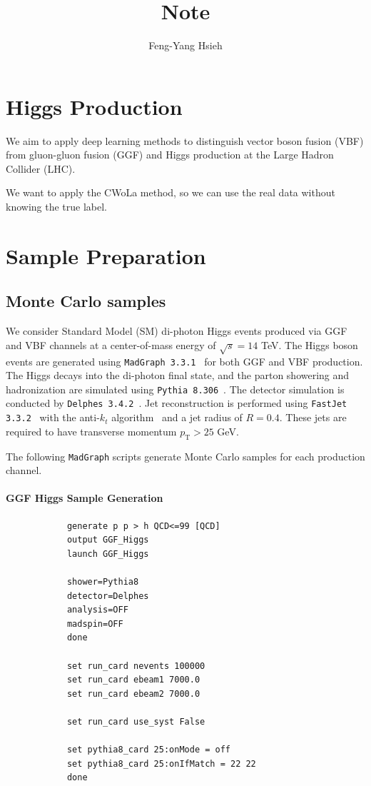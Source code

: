 \documentclass[12pt]{article}
\title{Note}
\author{Feng-Yang Hsieh}
\date{}
\begin{document}
\maketitle

\section{Higgs Production}%
\label{sec:higgs_production}
    We aim to apply deep learning methods to distinguish vector boson fusion (VBF) from gluon-gluon fusion (GGF) and Higgs production at the Large Hadron Collider (LHC).

    We want to apply the CWoLa method, so we can use the real data without knowing the true label.
\section{Sample Preparation}%
\label{sec:sample_preparation}
    \subsection{Monte Carlo samples}%
    \label{sub:monte_carlo_samples}
        We consider Standard Model (SM) di-photon Higgs events produced via GGF and VBF channels at a center-of-mass energy of $\sqrt{s} = 14$ TeV. The Higgs boson events are generated using \verb|MadGraph 3.3.1|~\cite{Alwall:2014hca} for both GGF and VBF production. The Higgs decays into the di-photon final state, and the parton showering and hadronization are simulated using \verb|Pythia 8.306|~\cite{Sjostrand:2014zea}. The detector simulation is conducted by \verb|Delphes 3.4.2|~\cite{deFavereau:2013fsa}. Jet reconstruction is performed using \verb|FastJet 3.3.2|~\cite{Cacciari:2011ma} with the anti-$k_t$ algorithm~\cite{Cacciari:2008gp} and a jet radius of $R = 0.4$. These jets are required to have transverse momentum $p_{\text{T}} > 25$ GeV.

        The following \verb|MadGraph| scripts generate Monte Carlo samples for each production channel.
        \paragraph{GGF Higgs Sample Generation}
        \begin{lstlisting}
            generate p p > h QCD<=99 [QCD]
            output GGF_Higgs
            launch GGF_Higgs

            shower=Pythia8
            detector=Delphes
            analysis=OFF
            madspin=OFF
            done

            set run_card nevents 100000
            set run_card ebeam1 7000.0
            set run_card ebeam2 7000.0

            set run_card use_syst False

            set pythia8_card 25:onMode = off
            set pythia8_card 25:onIfMatch = 22 22
            done
        \end{lstlisting}
\end{document}
